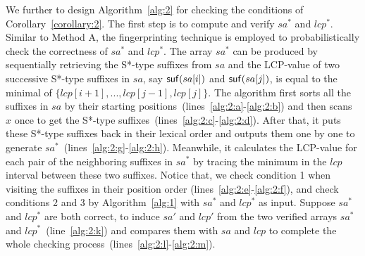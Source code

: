 \documentclass[10pt,journal,compsoc]{IEEEtran}
\begin{document}
We further to design Algorithm~\ref{alg:2} for checking the conditions of Corollary~\ref{corollary:2}. The first step is to compute and verify $sa^*$ and $lcp^*$. Similar to Method A, the fingerprinting technique is employed to probabilistically check the correctness of $sa^*$ and $lcp^*$.  The array $sa^*$ can be produced by sequentially retrieving the S*-type suffixes from $sa$ and the LCP-value of two successive S*-type suffixes in $sa$, say ${\sf suf}(sa[i])$ and ${\sf suf}(sa[j])$, is equal to the minimal of $\{lcp[i + 1], ..., lcp[j - 1], lcp[j]\}$. The algorithm first sorts all the suffixes in $sa$ by their starting positions~(lines~\ref{alg:2:a}-\ref{alg:2:b}) and then scans $x$ once to get the S*-type suffixes~(lines~\ref{alg:2:c}-\ref{alg:2:d}). After that, it puts these S*-type suffixes back in their lexical order and outputs them one by one to generate $sa^*$~(lines~\ref{alg:2:g}-\ref{alg:2:h}). Meanwhile, it calculates the LCP-value for each pair of the neighboring suffixes in $sa^*$ by tracing the minimum in the $lcp$ interval between these two suffixes. Notice that, we check condition 1 when visiting the suffixes in their position order (lines~\ref{alg:2:e}-\ref{alg:2:f}), and check conditions 2 and 3 by Algorithm~\ref{alg:1} with $sa^*$ and $lcp^*$ as input. Suppose $sa^*$ and $lcp^*$ are both correct, %
{} to induce $sa'$ and $lcp'$ from the two verified arrays $sa^*$ and $lcp^*$~(line~\ref{alg:2:k}) and compares them with $sa$ and $lcp$ to complete the whole checking process~(lines~\ref{alg:2:l}-\ref{alg:2:m}).
\end{document}

